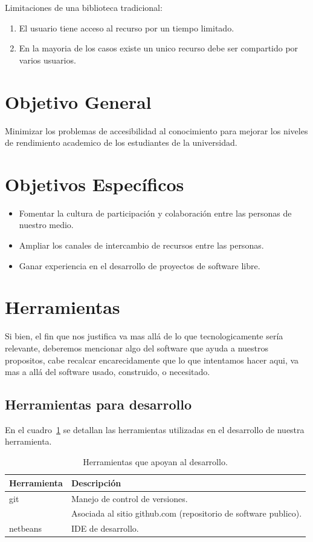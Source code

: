 \documentclass[letter,12pt]{article}
\begin{document}
Limitaciones de una biblioteca tradicional:

\begin{enumerate}
\item El usuario tiene acceso al recurso por un tiempo limitado.
\item En la mayoria de los casos existe un unico recurso debe ser compartido por varios usuarios.
\end{enumerate} 

\section{Objetivo General}
Minimizar los problemas de accesibilidad al conocimiento para mejorar los niveles de rendimiento
academico de los estudiantes de la universidad.

\section{Objetivos Específicos}
\begin{itemize}
\item Fomentar la cultura de participación y colaboración entre las personas de nuestro medio.
\item Ampliar los canales de intercambio de recursos entre las personas.
\item Ganar experiencia en el desarrollo de proyectos de software libre.
\end{itemize}

\section{Herramientas}
Si bien, el fin que nos justifica va mas allá de lo que tecnologicamente sería relevante,
deberemos mencionar algo del software que ayuda a nuestros propositos, cabe recalcar
encarecidamente que lo que intentamos hacer aqui, va mas a allá del software usado, construido, o
necesitado.

\subsection{Herramientas para desarrollo}
En el cuadro~\ref{herramientas_desarrollo} se detallan las herramientas utilizadas en el
desarrollo de nuestra herramienta.

\begin{table}
\begin{tabular}{l|l}
Herramienta & Descripción \\
\hline
git & Manejo de control de versiones. \\
& Asociada al sitio github.com (repositorio de software publico). \\
netbeans & IDE de desarrollo. \\

\end{tabular}
\caption{Herramientas que apoyan al desarrollo.}
\label{herramientas_desarrollo}
\end{table}
\end{document}
